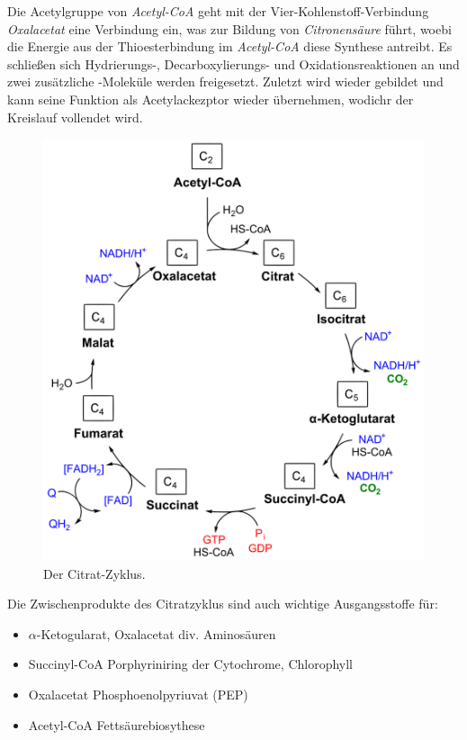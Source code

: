 Die Acetylgruppe von \textsl{Acetyl-CoA} geht mit der Vier-Kohlenstoff-Verbindung
\textsl{Oxalacetat} eine Verbindung ein,
was zur Bildung von \textsl{Citronensäure} führt,
woebi die Energie aus der Thioesterbindung im \textsl{Acetyl-CoA}
diese Synthese antreibt.
Es schließen sich Hydrierungs-, Decarboxylierungs- und Oxidationsreaktionen an
und zwei zusätzliche -Moleküle werden freigesetzt.
Zuletzt wird wieder  gebildet
und kann seine Funktion als Acetylackezptor wieder übernehmen,
wodichr der Kreislauf vollendet wird.
\cite[S. 140]{brock}

\begin{figure}[ht!]
	\leavevmode
	\begin{center}
		\includegraphics[scale=0.30]{./pictures/citratzyklus_1k}
	\end{center}
	\caption{Der Citrat-Zyklus.}
	\label{fig:calvinDetail}
\end{figure}

Die Zwischenprodukte des Citratzyklus sind auch wichtige Ausgangsstoffe für:
\begin{itemize}
	\item $\alpha$-Ketogularat, Oxalacetat \textrightarrow  div. Aminosäuren
	\item Succinyl-CoA \textrightarrow Porphyriniring der Cytochrome, Chlorophyll
	\item Oxalacetat \textrightarrow Phosphoenolpyriuvat (PEP)
	\item Acetyl-CoA \textrightarrow Fettsäurebiosythese
\end{itemize}

